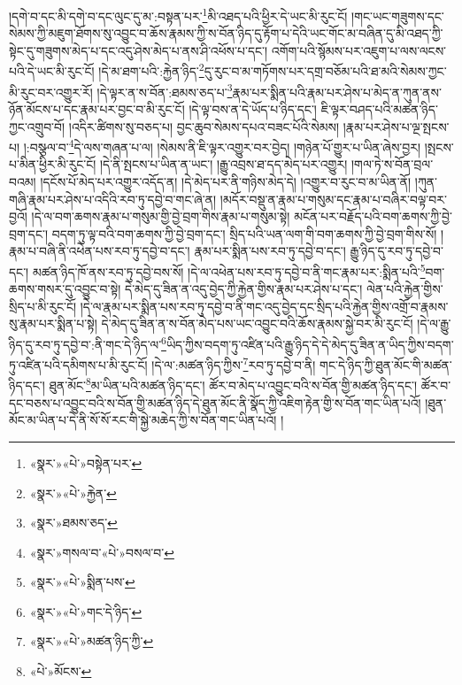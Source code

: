 །དགེ་བ་དང་མི་དགེ་བ་དང་ལུང་དུ་མ་:བསྟན་པར་\footnote{«སྣར་»«པེ་»བསྟེན་པར་}མི་འཐད་པའི་ཕྱིར་དེ་ཡང་མི་རུང་ངོ། །གང་ཡང་གཟུགས་དང་སེམས་ཀྱི་མཇུག་ཐོགས་སུ་འབྱུང་བ་ཆོས་རྣམས་ཀྱི་ས་བོན་ཉིད་དུ་རྟོག་པ་དེའི་ཡང་གོང་མ་བཞིན་དུ་མི་འཐད་ཀྱི་སྟེང་དུ་གཟུགས་མེད་པ་དང་འདུ་ཤེས་མེད་པ་ནས་ཤི་འཕོས་པ་དང་། འགོག་པའི་སྙོམས་པར་འཇུག་པ་ལས་ལངས་པའི་དེ་ཡང་མི་རུང་ངོ། །དེ་མ་ཐག་པའི་:རྐྱེན་ཉིད་\footnote{«སྣར་»«པེ་»རྐྱེན་}དུ་རུང་བ་མ་གཏོགས་པར་དགྲ་བཅོམ་པའི་ཐ་མའི་སེམས་ཀྱང་མི་རུང་བར་འགྱུར་རོ། །དེ་ལྟར་ན་ས་བོན་:ཐམས་ཅད་པ་\footnote{«སྣར་»ཐམས་ཅད་}རྣམ་པར་སྨིན་པའི་རྣམ་པར་ཤེས་པ་མེད་ན་ཀུན་ནས་ཉོན་མོངས་པ་དང་རྣམ་པར་བྱང་བ་མི་རུང་ངོ། །དེ་ལྟ་བས་ན་དེ་ཡོད་པ་ཉིད་དང་། ཇི་ལྟར་བཤད་པའི་མཚན་ཉིད་ཀྱང་འགྲུབ་བོ། །འདིར་ཚིགས་སུ་བཅད་པ། བྱང་ཆུབ་སེམས་དཔའ་བཟང་པོའི་སེམས། །རྣམ་པར་ཤེས་པ་ལྔ་སྤངས་པ། །:བསྩལ་བ་\footnote{«སྣར་»གསལ་བ་«པེ་»བསལ་བ་}དེ་ལས་གཞན་པ་ལ། །སེམས་ནི་ཇི་ལྟར་འགྱུར་བར་བྱེད། །གཉེན་པོ་གྱུར་པ་ཡིན་ཞེས་བྱར། །སྤངས་པ་མིན་ཕྱིར་མི་རུང་ངོ། །དེ་ནི་སྤངས་པ་ཡིན་ན་ཡང་། །རྒྱུ་འབྲས་ཐ་དད་མེད་པར་འགྱུར། །གལ་ཏེ་ས་བོན་བྲལ་བའམ། །དངོས་པོ་མེད་པར་འགྱུར་འདོད་ན། །དེ་མེད་པར་ནི་གཉིས་མེད་དེ། །འགྱུར་བ་རུང་བ་མ་ཡིན་ནོ། །ཀུན་གཞི་རྣམ་པར་ཤེས་པ་འདིའི་རབ་ཏུ་དབྱེ་བ་གང་ཞེ་ན། །མདོར་བསྡུ་ན་རྣམ་པ་གསུམ་དང་རྣམ་པ་བཞིར་བལྟ་བར་བྱའོ། །དེ་ལ་བག་ཆགས་རྣམ་པ་གསུམ་གྱི་བྱེ་བྲག་གིས་རྣམ་པ་གསུམ་སྟེ། མངོན་པར་བརྗོད་པའི་བག་ཆགས་ཀྱི་བྱེ་བྲག་དང་། བདག་ཏུ་ལྟ་བའི་བག་ཆགས་ཀྱི་བྱེ་བྲག་དང་། སྲིད་པའི་ཡན་ལག་གི་བག་ཆགས་ཀྱི་བྱེ་བྲག་གིས་སོ། །རྣམ་པ་བཞི་ནི་འཕེན་པས་རབ་ཏུ་དབྱེ་བ་དང་། རྣམ་པར་སྨིན་པས་རབ་ཏུ་དབྱེ་བ་དང་། རྒྱུ་ཉིད་དུ་རབ་ཏུ་དབྱེ་བ་དང་། མཚན་ཉིད་ཁོ་ནས་རབ་ཏུ་དབྱེ་བས་སོ། །དེ་ལ་འཕེན་པས་རབ་ཏུ་དབྱེ་བ་ནི་གང་རྣམ་པར་:སྨིན་པའི་\footnote{«སྣར་»«པེ་»སྨིན་པས་}བག་ཆགས་གསར་དུ་འབྱུང་བ་སྟེ། དེ་མེད་དུ་ཟིན་ན་འདུ་བྱེད་ཀྱི་རྐྱེན་གྱིས་རྣམ་པར་ཤེས་པ་དང་། ལེན་པའི་རྐྱེན་གྱིས་སྲིད་པ་མི་རུང་ངོ། །དེ་ལ་རྣམ་པར་སྨིན་པས་རབ་ཏུ་དབྱེ་བ་ནི་གང་འདུ་བྱེད་དང་སྲིད་པའི་རྐྱེན་གྱིས་འགྲོ་བ་རྣམས་སུ་རྣམ་པར་སྨིན་པ་སྟེ། དེ་མེད་དུ་ཟིན་ན་ས་བོན་མེད་པས་ཡང་འབྱུང་བའི་ཆོས་རྣམས་སྐྱེ་བར་མི་རུང་ངོ། །དེ་ལ་རྒྱུ་ཉིད་དུ་རབ་ཏུ་དབྱེ་བ་:ནི་གང་དེ་ཉིད་ལ་\footnote{«སྣར་»«པེ་»གང་དེ་ཉིད་}ཡིད་ཀྱིས་བདག་ཏུ་འཛིན་པའི་རྒྱུ་ཉིད་དེ་དེ་མེད་དུ་ཟིན་ན་ཡིད་ཀྱིས་བདག་ཏུ་འཛིན་པའི་དམིགས་པ་མི་རུང་ངོ། །དེ་ལ་:མཚན་ཉིད་ཀྱིས་\footnote{«སྣར་»«པེ་»མཚན་ཉིད་ཀྱི་}རབ་ཏུ་དབྱེ་བ་ནི། གང་དེ་ཉིད་ཀྱི་ཐུན་མོང་གི་མཚན་ཉིད་དང་། ཐུན་མོང་\footnote{«པེ་»མོངས་}མ་ཡིན་པའི་མཚན་ཉིད་དང་། ཚོར་བ་མེད་པ་འབྱུང་བའི་ས་བོན་གྱི་མཚན་ཉིད་དང་། ཚོར་བ་དང་བཅས་པ་འབྱུང་བའི་ས་བོན་གྱི་མཚན་ཉིད་དེ་ཐུན་མོང་ནི་སྣོད་ཀྱི་འཇིག་རྟེན་གྱི་ས་བོན་གང་ཡིན་པའོ། །ཐུན་མོང་མ་ཡིན་པ་དེ་ནི་སོ་སོ་རང་གི་སྐྱེ་མཆེད་ཀྱི་ས་བོན་གང་ཡིན་པའོ། །
